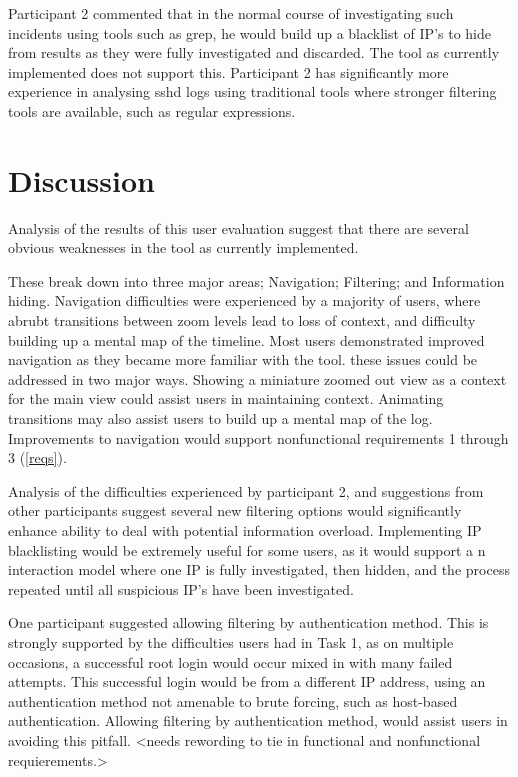 Participant 2 commented that in the normal course of investigating such incidents using tools such as grep, he would build up a blacklist of IP's to hide from results as they were fully investigated and discarded.
The tool as currently implemented does not support this. Participant 2 has significantly more experience in analysing sshd logs using traditional tools where stronger filtering tools are available, such as regular expressions. 

\section{Discussion} 

Analysis of the results of this user evaluation suggest that there are several obvious weaknesses in the tool as currently implemented. 

These break down into three major areas; Navigation; Filtering; and Information hiding.
Navigation difficulties were experienced by a majority of users, where abrubt transitions between zoom levels lead to loss of context, and difficulty building up a mental map of the timeline. 
Most users demonstrated improved navigation as they became more familiar with the tool. these issues could be addressed in two major ways. Showing a miniature zoomed out view as a context for the main view could assist users in maintaining context. 
Animating transitions may also assist users to build up a mental map of the log. Improvements to navigation would support nonfunctional requirements 1 through 3 (\ref{reqs}). 

Analysis of the difficulties experienced by participant 2, and suggestions from other participants suggest several new filtering options would significantly enhance ability to deal with potential information overload. 
Implementing IP blacklisting would be extremely useful for some users, as it would support a n interaction model where one IP is fully investigated, then hidden, and the process repeated until all suspicious IP's have been investigated. 

One participant suggested allowing filtering by authentication method. This is strongly supported by the difficulties users had in Task 1, as on multiple occasions, a successful root login would occur mixed in with many failed attempts. This successful login would be from a different IP address, using an authentication method not amenable to brute forcing, such as host-based authentication. Allowing filtering by authentication method, would assist users in avoiding this pitfall. <needs rewording to tie in functional and nonfunctional requierements.>


